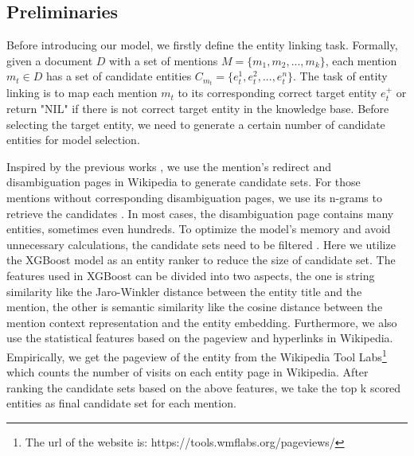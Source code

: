 \documentclass[sigconf]{acmart}
\begin{document}
\subsection{Preliminaries}
Before introducing our model, we firstly define the entity linking task. Formally, given a document $D$ with a set of mentions $M = \{m_1, m_2,...,m_k\}$, each mention $ m_t \in D$ has a set of candidate entities $C_{m_t} = \{e_{t}^1, e_{t}^2,..., e_{t}^n\}$. The task of entity linking is to map each mention $m_t$ to its corresponding correct target entity $e_{t}^+$ or return "NIL" if there is not correct target entity in the knowledge base. Before selecting the target entity, we need to generate a certain number of candidate entities for model selection.

Inspired by the previous works \cite{PappuBMST17, ZwicklbauerSG16, PhanSTHL17}, we use the mention's redirect and disambiguation pages in Wikipedia to generate candidate sets. For those mentions without corresponding disambiguation pages, we use its n-grams to retrieve the candidates \cite{PhanSTHL17}. In most cases, the disambiguation page contains many entities, sometimes even hundreds. To optimize the model's memory and avoid unnecessary calculations, the candidate sets need to be filtered \cite{0002HLL18, GaneaH17, TitovL18a}. Here we utilize the XGBoost model \cite{ChenG16} as an entity ranker to reduce the size of candidate set. The features used in XGBoost can be divided into two aspects, the one is string similarity like the Jaro-Winkler distance between the entity title and the mention, the other is semantic similarity like the cosine distance between the mention context representation and the entity embedding. Furthermore, we also use the statistical features based on the pageview and hyperlinks in Wikipedia. Empirically, we get the pageview of the entity from the Wikipedia Tool Labs\footnote{The url of the website is: https://tools.wmflabs.org/pageviews/} which counts the number of visits on each entity page in Wikipedia. After ranking the candidate sets based on the above features, we take the top k scored entities as final candidate set for each mention.
\end{document}
